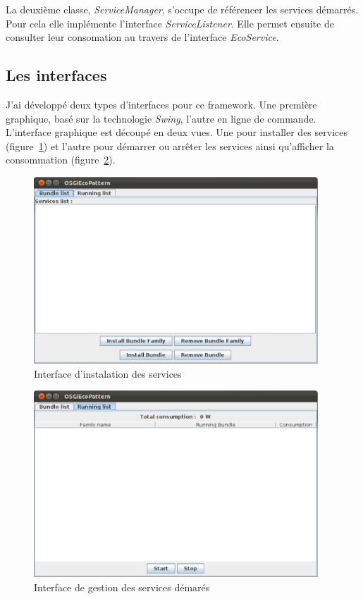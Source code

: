 \documentclass[a4paper, 11pt]{report}
\begin{document}
La deuxième classe, \textit{ServiceManager}, s'occupe de référencer les services démarrés. Pour cela elle implémente l'interface \textit{ServiceListener}. Elle permet ensuite de consulter leur consomation au travers de l'interface \textit{EcoService}.
		\subsection{Les interfaces}
J'ai développé deux types d'interfaces pour ce framework. Une première graphique, basé sur la technologie \textit{Swing}, l'autre en ligne de commande. L'interface graphique est découpé en deux vues. Une pour installer des services (figure~\ref{BdlList}) et l'autre pour démarrer ou arrêter les services ainsi qu'afficher la consommation (figure~\ref{RngList}).

\begin{figure}
	\centering
	\includegraphics[width=0.95\textwidth]{figures/EcoPattern_Bundle_List_View}
	\caption{Interface d'instalation des services}
	\label{BdlList}
\end{figure}
\begin{figure}
	\centering
	\includegraphics[width=0.95\textwidth]{figures/EcoPattern_Running_List_View}
	\caption{Interface de gestion des services démarés}
	\label{RngList}
\end{figure}
\end{document}
